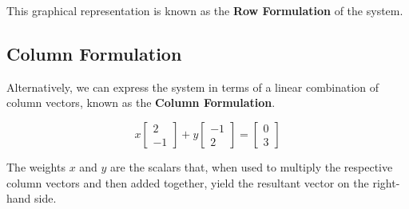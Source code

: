 This graphical representation is known as the \textbf{Row Formulation} of the system.

\subsection*{Column Formulation}

Alternatively, we can express the system in terms of a linear combination of column vectors, known as the \textbf{Column Formulation}.

\begin{equation*}
    x\begin{bmatrix}
        2 \\
        -1
    \end{bmatrix}
    +
    y\begin{bmatrix}
        -1 \\
        2
    \end{bmatrix}
    =
    \begin{bmatrix}
        0 \\
        3
    \end{bmatrix}
\end{equation*}

The weights \( x \) and \( y \) are the scalars that, when used to multiply the respective column vectors and then added together, yield the resultant vector on the right-hand side.



